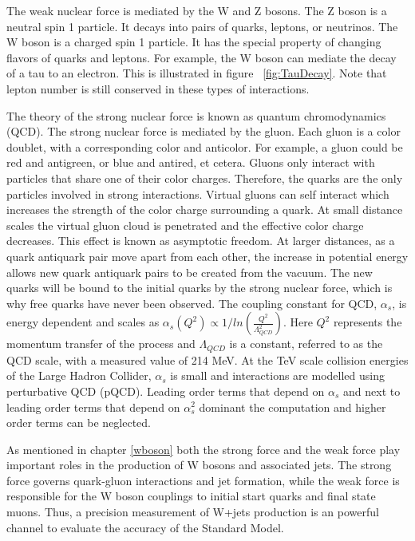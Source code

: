 \documentclass[oneside, letterpaper, oldfontcommands]{memoir}
\begin{document}
\qquad The weak nuclear force is mediated by the W and Z bosons. The Z boson is a neutral spin 1 particle. It decays into pairs of quarks, leptons, or neutrinos. The W boson is a charged spin 1 particle. It has the special property of changing flavors of quarks and leptons. For example, the W boson can mediate the decay of a tau to an electron. This is illustrated in figure ~\ref{fig:TauDecay}. Note that lepton number is still conserved in these types of interactions.  

\qquad The theory of the strong nuclear force is known as quantum chromodynamics (QCD). The strong nuclear force is mediated by the gluon. Each gluon is a color doublet, with a corresponding color and anticolor. For example, a gluon could be red and antigreen, or blue and antired, et cetera. Gluons only interact with particles that share one of their color charges. Therefore, the quarks are the only particles involved in strong interactions. Virtual gluons can self interact which increases the strength of the color charge surrounding a quark. At small distance scales the virtual gluon cloud is penetrated and the effective color charge decreases. This effect is known as asymptotic freedom. \cite{Halzen:1984mc} At larger distances, as a quark antiquark pair move apart from each other, the increase in potential energy allows new quark antiquark pairs to be created from the vacuum. The new quarks will be bound to the initial quarks by the strong nuclear force, which is why free quarks have never been observed. 
\qquad The coupling constant for QCD, $\alpha_{s}$, is energy dependent and scales as $\alpha_{s}(Q^{2}) \propto 1/ln(\frac{Q^{2}}{\Lambda_{QCD}^{2}})$. Here $Q^{2}$ represents the momentum transfer of the process and $\Lambda_{QCD}$ is a constant, referred to as the QCD scale, with a measured value of 214 MeV\cite{Agashe:2014kda}. At the TeV scale collision energies of the Large Hadron Collider, $\alpha_{s}$ is small and interactions are modelled using perturbative QCD (pQCD). Leading order terms that depend on $\alpha_{s}$ and next to leading order terms that depend on $\alpha_{s}^{2}$ dominant the computation and higher order terms can be neglected.

\qquad As mentioned in chapter \ref{wboson} both the strong force and the weak force play important roles in the production of W bosons and associated jets. The strong force governs quark-gluon interactions and jet formation, while the weak force is responsible for the W boson couplings to initial start quarks and final state muons. Thus, a precision measurement of W+jets production is an powerful channel to evaluate the accuracy of the Standard Model.
\end{document}
